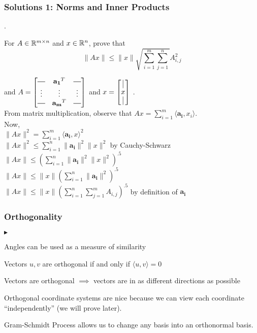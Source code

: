 \documentclass{beamer}
\renewenvironment{itemize}
\newcommand*{\horzbar}{\rule[.5ex]{2.5ex}{0.5pt}}
\renewenvironment{enumerate}%
{\begin{list}{\arabic{enumi}.}%
      {\setlength{\leftmargin}{2.5em}%
       \setlength{\itemsep}{-\parsep}%
       \setlength{\topsep}{-\parskip}%
       \usecounter{enumi}}%
 }{\end{list}}
\renewenvironment{itemize}%
{\begin{list}{$\blacktriangleright$}%
      {\setlength{\leftmargin}{2.5em}%
       \setlength{\itemsep}{-\parsep}%
       \setlength{\topsep}{-\parskip}%
       \usecounter{enumi}}%
 }{\end{list}}
\begin{document}
\begin{frame}
\frametitle{Solutions 1: Norms and Inner Products}

\begin{enumerate}
\item[2.] For $A \in \mathbb{R}^{m\times n}$ and $x\in \mathbb{R}^n$, prove that
$$ \|Ax\| \leq \|x\|\sqrt{\sum_{i=1}^m \sum_{j=1}^n} A_{i,j}^2$$
\begin{solution}
and $A = \begin{bmatrix}
			\horzbar    & \mathbf{a_1}^T    & \horzbar  \\
			\vdots    & \vdots & \vdots  \\
			\horzbar    & \mathbf{a_m}^T    & \horzbar   \\
		 \end{bmatrix}$
	and
	$x =  \begin{bmatrix}
			\vline \\
			 x \\   
			\vline \\ 
		 \end{bmatrix}$ .\\
From matrix multiplication, observe that $Ax = \sum_{i=1}^m  \langle \mathbf{a_i},x_i \rangle $.\\
Now,\\
\qquad $\|Ax\|^2 = \sum_{i=1}^m  \langle \mathbf{a_i},x \rangle ^2$ \\
\qquad $\|Ax\|^2 \leq \sum_{i=1}^n \|\mathbf{a_i}\|^2 \|x\|^2$ \qquad by Cauchy-Schwarz \\
\qquad $\|Ax\| \leq (\sum_{i=1}^n \|\mathbf{a_i}\|^2 \|x\|^2)^{.5}$\\
\qquad $\|Ax\| \leq \|x\|(\sum_{i=1}^n \|\mathbf{a_i}\|^2 )^{.5}$ \\
\qquad $\|Ax\| \leq \|x\|(\sum_{i=1}^n \sum_{j=1}^m A_{i,j})^{.5}$ \qquad by definition of $\mathbf{a_i}$

\end{solution}
\end{enumerate}
\end{frame}

\begin{frame}
\frametitle{Orthogonality}
\begin{itemize}
\item Angles can be used as a measure of similarity
\item Vectors $u,v$ are orthogonal if and only if $ \langle u,v \rangle =0$
\item Vectors are orthogonal $\implies$ vectors are in as different directions as possible
\item Orthogonal coordinate systems are nice because we can view each coordinate ``independently'' (we will prove later).
\item Gram-Schmidt Process allows us to change any basis into an orthonormal basis.
\end{itemize}
\end{frame}
\end{document}
